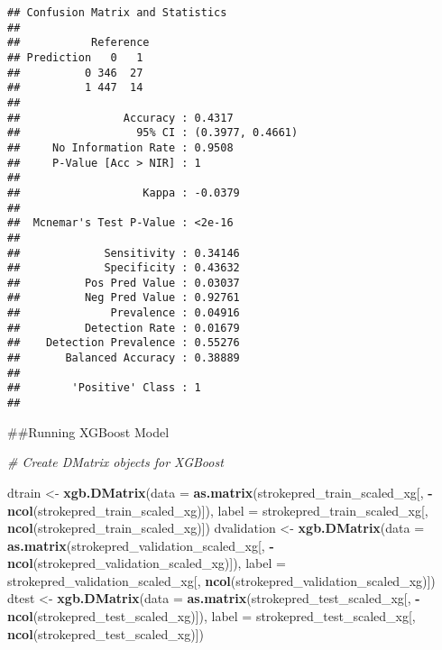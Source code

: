 \documentclass[
]{article}
\newenvironment{Shaded}{\begin{snugshade}}{\end{snugshade}}
\newcommand{\AttributeTok}[1]{\textcolor[rgb]{0.13,0.29,0.53}{#1}}
\newcommand{\CommentTok}[1]{\textcolor[rgb]{0.56,0.35,0.01}{\textit{#1}}}
\newcommand{\FunctionTok}[1]{\textcolor[rgb]{0.13,0.29,0.53}{\textbf{#1}}}
\newcommand{\NormalTok}[1]{#1}
\newcommand{\OtherTok}[1]{\textcolor[rgb]{0.56,0.35,0.01}{#1}}
\newcommand{\SpecialCharTok}[1]{\textcolor[rgb]{0.81,0.36,0.00}{\textbf{#1}}}
\begin{document}
\begin{verbatim}
## Confusion Matrix and Statistics
## 
##           Reference
## Prediction   0   1
##          0 346  27
##          1 447  14
##                                           
##                Accuracy : 0.4317          
##                  95% CI : (0.3977, 0.4661)
##     No Information Rate : 0.9508          
##     P-Value [Acc > NIR] : 1               
##                                           
##                   Kappa : -0.0379         
##                                           
##  Mcnemar's Test P-Value : <2e-16          
##                                           
##             Sensitivity : 0.34146         
##             Specificity : 0.43632         
##          Pos Pred Value : 0.03037         
##          Neg Pred Value : 0.92761         
##              Prevalence : 0.04916         
##          Detection Rate : 0.01679         
##    Detection Prevalence : 0.55276         
##       Balanced Accuracy : 0.38889         
##                                           
##        'Positive' Class : 1               
## 
\end{verbatim}

\#\#Running XGBoost Model

\begin{Shaded}
\begin{Highlighting}[]
\CommentTok{\# Create DMatrix objects for XGBoost}

\NormalTok{dtrain }\OtherTok{\textless{}{-}} \FunctionTok{xgb.DMatrix}\NormalTok{(}\AttributeTok{data =} \FunctionTok{as.matrix}\NormalTok{(strokepred\_train\_scaled\_xg[, }\SpecialCharTok{{-}}\FunctionTok{ncol}\NormalTok{(strokepred\_train\_scaled\_xg)]), }\AttributeTok{label =}\NormalTok{ strokepred\_train\_scaled\_xg[, }\FunctionTok{ncol}\NormalTok{(strokepred\_train\_scaled\_xg)])}
\NormalTok{dvalidation }\OtherTok{\textless{}{-}} \FunctionTok{xgb.DMatrix}\NormalTok{(}\AttributeTok{data =} \FunctionTok{as.matrix}\NormalTok{(strokepred\_validation\_scaled\_xg[, }\SpecialCharTok{{-}}\FunctionTok{ncol}\NormalTok{(strokepred\_validation\_scaled\_xg)]), }\AttributeTok{label =}\NormalTok{ strokepred\_validation\_scaled\_xg[, }\FunctionTok{ncol}\NormalTok{(strokepred\_validation\_scaled\_xg)])}
\NormalTok{dtest }\OtherTok{\textless{}{-}} \FunctionTok{xgb.DMatrix}\NormalTok{(}\AttributeTok{data =} \FunctionTok{as.matrix}\NormalTok{(strokepred\_test\_scaled\_xg[, }\SpecialCharTok{{-}}\FunctionTok{ncol}\NormalTok{(strokepred\_test\_scaled\_xg)]), }\AttributeTok{label =}\NormalTok{ strokepred\_test\_scaled\_xg[, }\FunctionTok{ncol}\NormalTok{(strokepred\_test\_scaled\_xg)])}
\end{Highlighting}
\end{Shaded}
\end{document}
